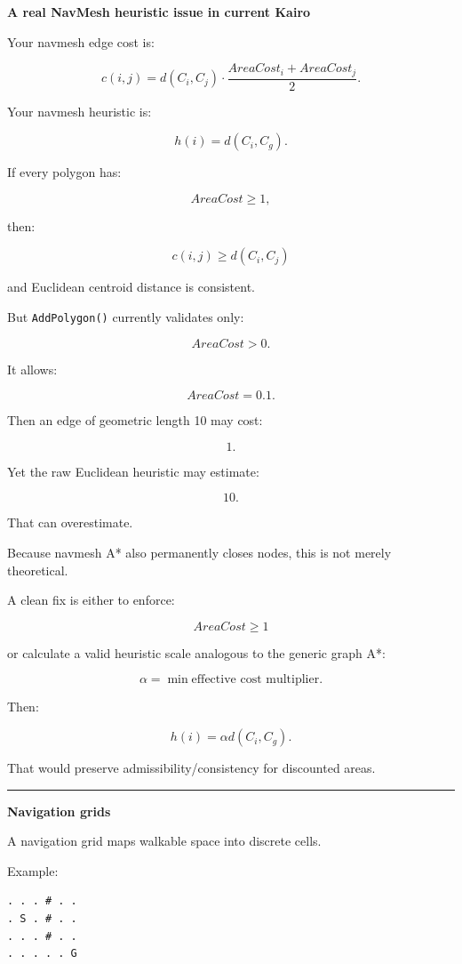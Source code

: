 \textbf{A real NavMesh heuristic issue in current Kairo}

Your navmesh edge cost is:

\[
c(i,j)
=
d(C_i,C_j)
\cdot
\frac{
AreaCost_i+AreaCost_j
}{2}.
\]

Your navmesh heuristic is:

\[
h(i)
=
d(C_i,C_g).
\]

If every polygon has:

\[
AreaCost\ge1,
\]

then:

\[
c(i,j)\ge d(C_i,C_j)
\]

and Euclidean centroid distance is consistent.

But \texttt{AddPolygon()} currently validates only:

\[
AreaCost>0.
\]

It allows:

\[
AreaCost=0.1.
\]

Then an edge of geometric length 10 may cost:

\[
1.
\]

Yet the raw Euclidean heuristic may estimate:

\[
10.
\]

That can overestimate.

Because navmesh A* also permanently closes nodes, this is not merely theoretical.

A clean fix is either to enforce:

\[
AreaCost\ge1
\]

or calculate a valid heuristic scale analogous to the generic graph A*:

\[
\alpha
=
\min
\text{effective cost multiplier}.
\]

Then:

\[
h(i)
=
\alpha d(C_i,C_g).
\]

That would preserve admissibility/consistency for discounted areas.

\begin{center}\rule{0.5\linewidth}{0.5pt}\end{center}

\textbf{Navigation grids}

A navigation grid maps walkable space into discrete cells.

Example:

\begin{verbatim}
. . . # . .
. S . # . .
. . . # . .
. . . . . G
\end{verbatim}


